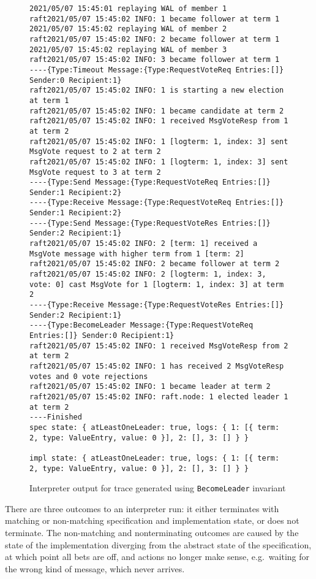 \documentclass[a4paper]{article}
\begin{document}
\begin{figure}
\centering
\begin{lstlisting}[breaklines=true,basicstyle=\ttfamily]
2021/05/07 15:45:01 replaying WAL of member 1
raft2021/05/07 15:45:02 INFO: 1 became follower at term 1
2021/05/07 15:45:02 replaying WAL of member 2
raft2021/05/07 15:45:02 INFO: 2 became follower at term 1
2021/05/07 15:45:02 replaying WAL of member 3
raft2021/05/07 15:45:02 INFO: 3 became follower at term 1
----{Type:Timeout Message:{Type:RequestVoteReq Entries:[]} Sender:0 Recipient:1}
raft2021/05/07 15:45:02 INFO: 1 is starting a new election at term 1
raft2021/05/07 15:45:02 INFO: 1 became candidate at term 2
raft2021/05/07 15:45:02 INFO: 1 received MsgVoteResp from 1 at term 2
raft2021/05/07 15:45:02 INFO: 1 [logterm: 1, index: 3] sent MsgVote request to 2 at term 2
raft2021/05/07 15:45:02 INFO: 1 [logterm: 1, index: 3] sent MsgVote request to 3 at term 2
----{Type:Send Message:{Type:RequestVoteReq Entries:[]} Sender:1 Recipient:2}
----{Type:Receive Message:{Type:RequestVoteReq Entries:[]} Sender:1 Recipient:2}
----{Type:Send Message:{Type:RequestVoteRes Entries:[]} Sender:2 Recipient:1}
raft2021/05/07 15:45:02 INFO: 2 [term: 1] received a MsgVote message with higher term from 1 [term: 2]
raft2021/05/07 15:45:02 INFO: 2 became follower at term 2
raft2021/05/07 15:45:02 INFO: 2 [logterm: 1, index: 3, vote: 0] cast MsgVote for 1 [logterm: 1, index: 3] at term 2
----{Type:Receive Message:{Type:RequestVoteRes Entries:[]} Sender:2 Recipient:1}
----{Type:BecomeLeader Message:{Type:RequestVoteReq Entries:[]} Sender:0 Recipient:1}
raft2021/05/07 15:45:02 INFO: 1 received MsgVoteResp from 2 at term 2
raft2021/05/07 15:45:02 INFO: 1 has received 2 MsgVoteResp votes and 0 vote rejections
raft2021/05/07 15:45:02 INFO: 1 became leader at term 2
raft2021/05/07 15:45:02 INFO: raft.node: 1 elected leader 1 at term 2
----Finished
spec state: { atLeastOneLeader: true, logs: { 1: [{ term: 2, type: ValueEntry, value: 0 }], 2: [], 3: [] } }

impl state: { atLeastOneLeader: true, logs: { 1: [{ term: 2, type: ValueEntry, value: 0 }], 2: [], 3: [] } }
\end{lstlisting}
\label{fig:output}
\caption{Interpreter output for trace generated using \texttt{BecomeLeader} invariant}
\end{figure}

There are three outcomes to an interpreter run: it either terminates with matching or non-matching specification and implementation state, or does not terminate.
%
The non-matching and nonterminating outcomes are caused by the state of the implementation diverging from the abstract state of the specification, at which point all bets are off, and actions no longer make sense, e.g.~waiting for the wrong kind of message, which never arrives.
\end{document}
